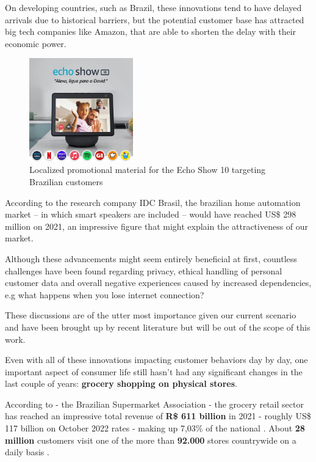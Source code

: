 \documentclass[openright]{normas-utf-tex} %
\begin{document}
On developing countries, such as Brazil, these innovations tend to
have delayed arrivals due to historical barriers, but the potential
customer base has attracted big tech companies like Amazon, that are able
to shorten the delay with their economic power.

\begin{figure}[h!]
	\centering
	\includegraphics[width=0.4\textwidth]{./images/alexabr.jpg} %
	\caption[Localized promotional material for the Echo Show 10 targeting Brazilian customers]{Localized promotional material for the Echo Show 10 targeting Brazilian customers}
    \label{fig:alexabr}
\end{figure}

According to the research company IDC Brasil, the brazilian home automation
market -- in which smart speakers are included -- would have reached US\$ 298
million on 2021, an impressive figure that might explain the attractiveness of
our market.

Although these advancements might seem entirely beneficial at first, countless
challenges have been found regarding privacy, ethical handling of personal
customer data and overall negative experiences caused by increased
dependencies, e.g what happens when you lose internet connection?

These discussions are of the utter most importance given our current scenario
and have been brought up by recent literature \cite{Echoes2022,He2019}
but will be out of the scope of this work.


Even with all of these innovations impacting customer behaviors day by day, one
important aspect of consumer life still hasn't had any significant changes in
the last couple of years: \textbf{grocery shopping on
physical stores}.

According to  - the
Brazilian Supermarket Association - the grocery retail sector has reached an
impressive total revenue of \textbf{R\$ 611 billion} in 2021 - roughly US\$ 117 billion on
October 2022 rates - making up 7,03\% of the national . About \textbf{28 million} customers visit one of the more than
\textbf{92.000} stores countrywide on a daily basis \cite{Abras2022}.
\end{document}
